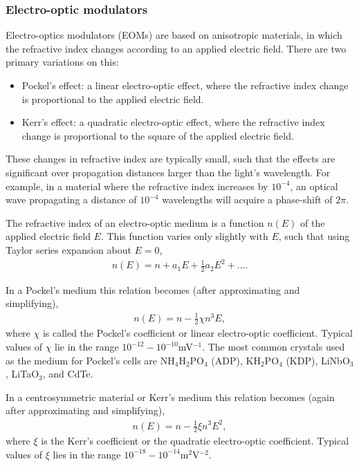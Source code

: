 \subsubsection{Electro-optic modulators} 

Electro-optics modulators (EOMs) are based on anisotropic materials, in which the refractive index changes according to an applied electric field. There are two primary variations on this:
\begin{itemize}
	\item Pockel's effect: a linear electro-optic effect, where the refractive index change is proportional to the applied electric field.
	\item Kerr's effect: a quadratic electro-optic effect, where the refractive index change is proportional to the square of the applied electric field.
\end{itemize}

These changes in refractive index are typically small, such that the effects are significant over propagation distances larger than the light's wavelength. For example, in a material where the refractive index increases by $10^{-4}$, an optical wave propagating a distance of $10^{-4}$ wavelengths will acquire a phase-shift of $2\pi$.

The refractive index of an electro-optic medium is a function $n(E)$ of the applied electric field $E$. This function varies only slightly with $E$, such that using Taylor series expansion about \mbox{$E=0$},
\begin{align}
n(E) = n+a_1E + \frac{1}{2}a_2E^2+\dots.
\end{align}

In a Pockel's medium this relation becomes (after approximating and simplifying),
\begin{align}
n(E) = n-\frac{1}{2}\chi n^3 E,
\end{align}
where $\chi$ is called the Pockel's coefficient or linear electro-optic coefficient. Typical values of $\chi$ lie in the range $10^{-12}-10^{-10}$mV$^{-1}$. The most common crystals used as the medium for Pockel's cells are NH$_4$H$_2$PO$_4$ (ADP), KH$_2$PO$_4$ (KDP), LiNbO$_3$, LiTaO$_3$, and CdTe.

In a centrosymmetric material or Kerr's medium this relation becomes (again after approximating and simplifying),
\begin{align}
n(E) = n-\frac{1}{2}\xi n^3 E^2,
\end{align}
where $\xi$ is the Kerr's coefficient or the quadratic electro-optic coefficient. Typical values of $\xi$ lies in the range $10^{-18}-10^{-14}$m$^2$V$^{-2}$.

